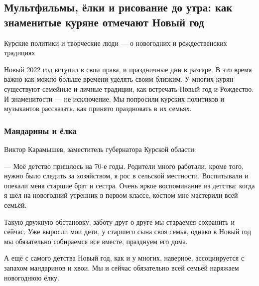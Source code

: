  
 
 
 
 
 
\subsection{Мультфильмы, ёлки и рисование до утра: как знаменитые куряне отмечают Новый год}
\label{sec:07_01_2022.stz.news.ru.ria_kursk.1.novyj_god}
 

\begin{zznagolos}
Курские политики и творческие люди — о новогодних и рождественских традициях
\end{zznagolos}


Новый 2022 год вступил в свои права, и праздничные дни в разгаре. В это время
важно как можно больше времени уделять своим близким.  У многих курян
существуют семейные и личные традиции, как встречать Новый год и Рождество. И
знаменитости — не исключение. Мы попросили курских политиков и музыкантов
рассказать, как принято праздновать в их семьях.

\subsubsection{Мандарины и ёлка}

Виктор Карамышев, заместитель губернатора Курской области:



\begin{zzquote}
— Моё детство пришлось на 70-е годы. Родители много работали, кроме того, нужно
было следить за хозяйством, я рос в сельской местности. Воспитывали и опекали
меня старшие брат и сестра. Очень яркое воспоминание из детства: когда я шёл на
новогодний утренник в первом классе, костюм мне мастерили всей семьёй.

Такую дружную обстановку, заботу друг о друге мы стараемся сохранить и сейчас.
Уже выросли мои дети, у старшего сына своя семья, однако в Новый год мы
обязательно собираемся все вместе, празднуем его дома.

А ещё с самого детства Новый год, как и у многих, наверное, ассоциируется с
запахом мандаринов и хвои. Мы и сейчас обязательно всей семьёй наряжаем
новогоднюю ёлку.
\end{zzquote}

